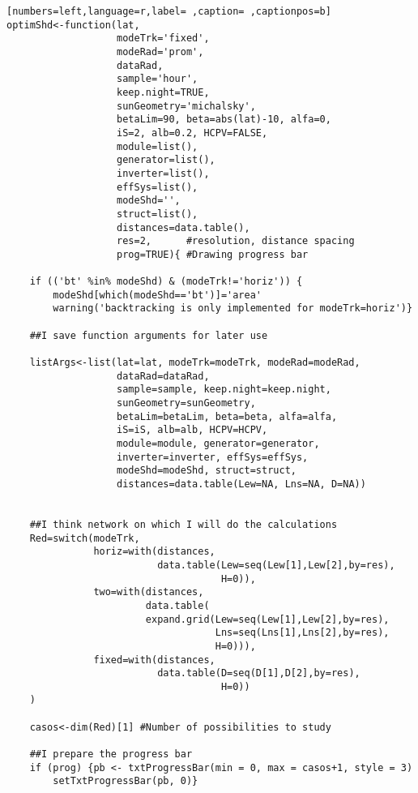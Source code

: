 \begin{lstlisting}[numbers=left,language=r,label= ,caption= ,captionpos=b]
optimShd<-function(lat,
                   modeTrk='fixed', 
                   modeRad='prom', 
                   dataRad,
                   sample='hour',
                   keep.night=TRUE,
                   sunGeometry='michalsky',
                   betaLim=90, beta=abs(lat)-10, alfa=0,
                   iS=2, alb=0.2, HCPV=FALSE,
                   module=list(), 
                   generator=list(),
                   inverter=list(), 
                   effSys=list(), 
                   modeShd='',    
                   struct=list(), 
                   distances=data.table(),
                   res=2,      #resolution, distance spacing
                   prog=TRUE){ #Drawing progress bar

    if (('bt' %in% modeShd) & (modeTrk!='horiz')) {
        modeShd[which(modeShd=='bt')]='area'
        warning('backtracking is only implemented for modeTrk=horiz')}

    ##I save function arguments for later use

    listArgs<-list(lat=lat, modeTrk=modeTrk, modeRad=modeRad,
                   dataRad=dataRad,
                   sample=sample, keep.night=keep.night,
                   sunGeometry=sunGeometry,
                   betaLim=betaLim, beta=beta, alfa=alfa,
                   iS=iS, alb=alb, HCPV=HCPV,
                   module=module, generator=generator,
                   inverter=inverter, effSys=effSys,
                   modeShd=modeShd, struct=struct,
                   distances=data.table(Lew=NA, Lns=NA, D=NA))


    ##I think network on which I will do the calculations
    Red=switch(modeTrk,
               horiz=with(distances,
                          data.table(Lew=seq(Lew[1],Lew[2],by=res),
                                     H=0)),
               two=with(distances,
                        data.table(
                        expand.grid(Lew=seq(Lew[1],Lew[2],by=res),
                                    Lns=seq(Lns[1],Lns[2],by=res),
                                    H=0))),
               fixed=with(distances,
                          data.table(D=seq(D[1],D[2],by=res),
                                     H=0))
    )

    casos<-dim(Red)[1] #Number of possibilities to study

    ##I prepare the progress bar
    if (prog) {pb <- txtProgressBar(min = 0, max = casos+1, style = 3)
        setTxtProgressBar(pb, 0)}


\end{lstlisting}
